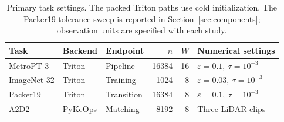 \begin{table}[!t]
\centering
\caption{Primary task settings. The packed Triton paths use cold initialization. The Packer19 tolerance sweep is reported in Section~\ref{sec:components}; observation units are specified with each study.}
\label{tab:workload-configs}
\small
\setlength{\tabcolsep}{5pt}
\renewcommand{\arraystretch}{1.15}
\begin{tabular}{@{}lllrrl@{}}
\toprule
Task & Backend & Endpoint & $n$ & $W$ & Numerical settings \\
\midrule
MetroPT-3 & Triton & Pipeline & 16384 & 16 & $\varepsilon=0.1,\ \tau=10^{-3}$ \\
ImageNet-32 & Triton & Training & 1024 & 8 & $\varepsilon=0.03,\ \tau=10^{-3}$ \\
Packer19 & Triton & Transition & 16384 & 8 & $\varepsilon=0.1,\ \tau=10^{-3}$ \\
A2D2 & PyKeOps & Matching & 8192 & 8 & Three LiDAR clips \\
\bottomrule
\end{tabular}
\end{table}
